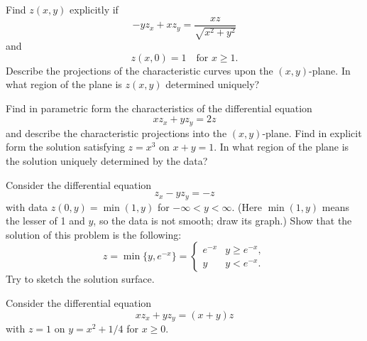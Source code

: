 \documentclass[answers]{exam}
\begin{document}
\begin{questions}
\question%
Find $z(x, y)$ explicitly if \[
	-y z_{x}+x z_{y}=\frac{x z}{\sqrt{x^{2}+y^{2}}}
\] and \[
	z(x, 0)=1 \quad \text{for } x \geq 1.
\] Describe the projections of the characteristic curves upon the $(x, y)$-plane. In what region of the plane is $z(x, y)$ determined uniquely?



\question%
Find in parametric form the characteristics of the differential equation \[
	x z_{x}+y z_{y}=2 z
\] and describe the characteristic projections into the $(x, y)$-plane. Find in explicit form the solution satisfying $z=x^{3}$ on $x+y=1$. In what region of the plane is the solution uniquely determined by the data?



\question%
Consider the differential equation \[
	z_{x}-y z_{y}=-z
\] with data $z(0, y)=\min (1, y)$ for $-\infty<y<\infty$. (Here $\min (1, y)$ means the lesser of 1 and $y$, so the data is not smooth; draw its graph.) Show that the solution of this problem is the following: \[
	z=\min\{y,e^{-x}\}=\begin{cases}
		e^{-x}&y\geq e^{-x},\\
		y&y<e^{-x}.
	\end{cases}
\] Try to sketch the solution surface.



\question%
Consider the differential equation \[
	x z_{x}+y z_{y}=(x+y) z
\] with $z=1$ on $y=x^{2}+1 / 4$ for $x \geq 0$.

\end{questions}
\end{document}
